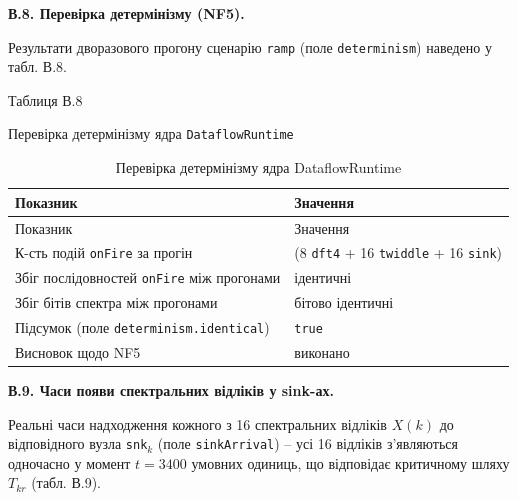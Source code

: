 \documentclass[
]{article}
\newcommand{\passthrough}[1]{#1}
\begin{document}
\textbf{В.8. Перевірка детермінізму (NF5).}

Результати дворазового прогону сценарію \passthrough{\lstinline!ramp!}
(поле \passthrough{\lstinline!determinism!}) наведено у табл. В.8.

Таблиця В.8

Перевірка детермінізму ядра \passthrough{\lstinline!DataflowRuntime!}

\begin{longtable}[]{@{}
  >{\raggedright\arraybackslash}p{}
  >{\raggedright\arraybackslash}p{}@{}}
\caption[Перевірка детермінізму ядра DataflowRuntime]{Перевірка
детермінізму ядра DataflowRuntime}\tabularnewline
\toprule\noalign{}
\begin{minipage}[b]{\linewidth}\raggedright
Показник
\end{minipage} & \begin{minipage}[b]{\linewidth}\raggedright
Значення
\end{minipage} \\
\midrule\noalign{}
\endfirsthead
\toprule\noalign{}
\begin{minipage}[b]{\linewidth}\raggedright
Показник
\end{minipage} & \begin{minipage}[b]{\linewidth}\raggedright
Значення
\end{minipage} \\
\midrule\noalign{}
\endhead
\bottomrule\noalign{}
\endlastfoot
К-сть подій \passthrough{\lstinline!onFire!} за прогін & (8
\passthrough{\lstinline!dft4!} + 16 \passthrough{\lstinline!twiddle!} +
16 \passthrough{\lstinline!sink!}) \\
Збіг послідовностей \passthrough{\lstinline!onFire!} між прогонами &
ідентичні \\
Збіг бітів спектра між прогонами & бітово ідентичні \\
Підсумок (поле \passthrough{\lstinline!determinism.identical!}) &
\passthrough{\lstinline!true!} \\
Висновок щодо NF5 & виконано \\
\end{longtable}

\textbf{В.9. Часи появи спектральних відліків у sink-ах.}

Реальні часи надходження кожного з 16 спектральних відліків \(X(k)\) до
відповідного вузла \passthrough{\lstinline!snk!}\(_{k}\) (поле
\passthrough{\lstinline!sinkArrival!}) -- усі 16 відліків з'являються
одночасно у момент \(t = 3400\) умовних одиниць, що відповідає
критичному шляху \(T_{kr}\) (табл. В.9).
\end{document}
